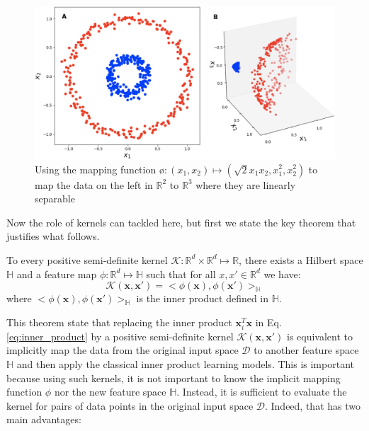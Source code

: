 \begin{figure}[H]
\centering
\includegraphics[scale=0.25]{LatexDiss/Dissertation/figs/poly_kenrnel.png}
\caption[Lifting data to a higher-dimension space to get linearly separable classes]{ Using the mapping function \o$:(x_1,x_2)\mapsto (\sqrt{2}x_1x_2,x_1^2,x_2^2)$ to map the data on the left in $\mathbb{R}^2$ to $\mathbb{R}^3$ where they are linearly separable}
\label{fig:polynomial_kernel}
\end{figure}
Now the role of kernels can tackled here, but first we state the key theorem that justifies what follows.
\begin{theorem}
To every positive semi-definite kernel $\mathcal{K}:\mathbb{R}^d\times \mathbb{R}^d\mapsto \mathbb{R}$, there exists a Hilbert space $\mathbb{H}$ and a feature map $\phi:\mathbb{R}^d\mapsto\mathbb{H}$ such that for all $x,x'\in\mathbb{R}^d$ we have: 
\begin{equation}
\label{eq:kernel_main_equation}
    \mathcal{K}(\mathbf{x},\mathbf{x}')=<\phi(\mathbf{x}),\phi(\mathbf{x}')>_\mathbb{H}
\end{equation}
where $<\phi(\mathbf{x}),\phi(\mathbf{x}')>_\mathbb{H}$ is the inner product defined in $\mathbb{H}$.
\end{theorem}
This theorem state that replacing the inner product \textbf{$\mathbf{x}_i^T\mathbf{x}$} in Eq. \ref{eq:inner_product} by a positive semi-definite kernel $\mathcal{K}(\mathbf{x},\mathbf{x}')$ is equivalent to implicitly map the data from the original input space $\mathcal{D}$ to another feature space $\mathbb{H}$ and then apply the classical inner product learning models. This is important because using such kernels, it is not important to know the implicit mapping function $\phi$ nor the new feature space $\mathbb{H}$. Instead, it is sufficient to evaluate the kernel for pairs of data points in the original input space $\mathcal{D}$. Indeed, that has two main advantages:
